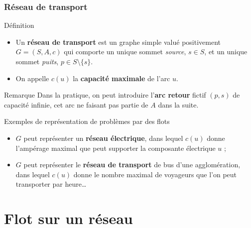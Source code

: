 \documentclass[french,10pt,t,handout]{beamer}
\begin{document}
\begin{frame}%
	\frametitle{R\'eseau de transport}
	
	\begin{block}{D\'efinition}
 		\begin{itemize}
 		  \item Un \textbf{r\'eseau de transport} est un graphe simple valu\'e positivement $G=(S,A,c)$
 		  qui comporte un unique sommet \emph{source}, $s \in S$, et un unique sommet \emph{puits},
 		  $p \in S \setminus \{s\}$.
		  \item On appelle $c(u)$ la \textbf{capacit\'e maximale} de l'arc $u$.
 		\end{itemize}
	\end{block}
	
	\begin{block}{Remarque}
		Dans la pratique, on peut introduire l'\textbf{arc retour} fictif $(p,s)$ de capacit\'e infinie, cet arc 
		ne faisant pas partie de $A$ dans la suite.
	\end{block}
	
	\vfill
	
	\begin{exampleblock}{Exemples de repr\'esentation de probl\`emes par des flots}
		\begin{itemize}
		  \item $G$ peut repr\'esenter un \textbf{r\'eseau \'electrique}, dans lequel $c(u)$ donne l'amp\'erage maximal que
		  peut supporter la composante \'electrique $u$ ;
		  \item $G$ peut repr\'esenter le \textbf{r\'eseau de transport} de bus d'une agglom\'eration, dans lequel $c(u)$
		  donne le nombre maximal de voyageurs que l'on peut transporter par heure\ldots
		\end{itemize}
	\end{exampleblock}
\end{frame}



\section{Flot sur un r\'eseau}
\end{document}
